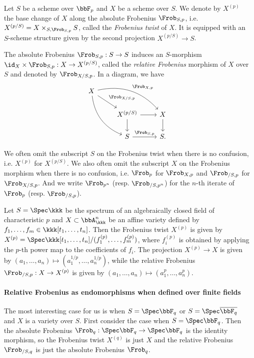  \begin{definition}
    Let $S$ be a scheme over $\bbF_p$ and $X$ be a scheme over $S$.
    We denote by $X^{(p)}$ the base change of $X$ along the absolute Frobenius $\Frob_{S,p}$, i.e. $X^{(p/S)} = X \times_{S, \Frob_{S,p}} S$, called the \emph{Frobenius twist} of $X$.
    It is equipped with an $S$-scheme structure given by the second projection $X^{(p/S)} \to S$.

    The absolute Frobenius $\Frob_{S,p}: S \to S$ induces an $S$-morphism $\id_X \times \Frob_{S,p}: X \to X^{(p/S)}$, called the \emph{relative Frobenius} morphism of $X$ over $S$ and denoted by $\Frob_{X/S, p}$.
    In a diagram, we have
    \[ \begin{tikzcd}
      X \arrow[rrd, bend left, "\Frob_{X,p}"] \arrow[rdd, bend right] \arrow[rd, "\Frob_{X/S,p}"] & & \\
      & X^{(p/S)} \arrow[r] \arrow[d] & X \arrow[d] \\
      & S \arrow[r, "\Frob_{S,p}"] & S.
    \end{tikzcd} \]
  \end{definition}
  \begin{remark}
    We often omit the subscript $S$ on the Frobenius twist when there is no confusion, i.e. $X^{(p)}$ for $X^{(p/S)}$.
    We also often omit the subscript $X$ on the Frobenius morphism when there is no confusion, i.e. $\Frob_p$ for $\Frob_{X,p}$ and $\Frob_{/S,p}$ for $\Frob_{X/S,p}$.
    And we write $\Frob_{p^n}$ (resp. $\Frob_{/S,p^n}$) for the $n$-th iterate of $\Frob_p$ (resp. $\Frob_{/S,p}$).
  \end{remark}

  \begin{example}
    Let $S = \Spec \kkk$ be the spectrum of an algebraically closed field of characteristic $p$ and $X \subset \bbA^n_\kkk$ be an affine variety defined by $f_1, \dots, f_m \in \kkk[t_1, \dots, t_n]$.
    Then the Frobenius twist $X^{(p)}$ is given by $X^{(p)} = \Spec \kkk[t_1, \dots, t_n]/(f_1^{(p)}, \dots, f_m^{(p)})$, where $f_i^{(p)}$ is obtained by applying the $p$-th power map to the coefficients of $f_i$.
    The projection $X^{(p)} \to X$ is given by $(a_1, \dots, a_n) \mapsto (a_1^{1/p}, \dots, a_n^{1/p})$, while the relative Frobenius $\Frob_{/S,p}: X \to X^{(p)}$ is given by $(a_1, \dots, a_n) \mapsto (a_1^p, \dots, a_n^p)$.
  \end{example}

  \paragraph{Relative Frobenius as endomorphisms when defined over finite fields}
  The most interesting case for us is when $S = \Spec \bbF_q$ or $S = \Spec \overline{\bbF_q}$ and $X$ is a variety over $S$.
  First consider the case when $S = \Spec \bbF_q$.
  Then the absolute Frobenius $\Frob_q: \Spec \bbF_q \to \Spec \bbF_q$ is the identity morphism, so the Frobenius twist $X^{(q)}$ is just $X$ and the relative Frobenius $\Frob_{/S,q}$ is just the absolute Frobenius $\Frob_q$.
  
